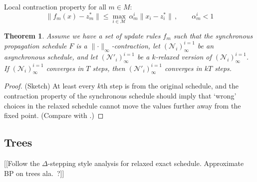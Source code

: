 \documentclass[11pt,a4paper]{article}
\newtheorem{theorem}{Theorem}
\theoremstyle{remark}
\newcommand{\M}{\mathcal{M}}
\newcommand{\N}{\mathcal{N}}
\newcommand{\norm}[1]{\lVert #1 \rVert}
\begin{document}
Local contraction property for all $m \in M$:
\[ \norm{f_m(x) - z_m^* } \le \max_{i \in \M} \, \alpha^i_m \norm{ x_i - z_i^* }\,,\qquad \alpha^i_m < 1  \]

\begin{theorem}
Assume we have a set of update rules $f_m$ such that the synchronous propagation schedule $F$ is a $\norm{\cdot}_\infty$-contraction, let $(\N_i)^{i = 1}_\infty$ be an asynchronous schedule, and let $(\N'_i)^{i = 1}_\infty$ be a $k$-relaxed version of $(\N_i)^{i = 1}_\infty$. If $(\N_i)^{i = 1}_\infty$ converges in $T$ steps, then $(\N'_i)^{i = 1}_\infty$ converges in $kT$ steps.
\end{theorem}

\begin{proof}
(Sketch) At least every $k$th step is from the original schedule, and the contraction property of the synchronous schedule should imply that `wrong' choices in the relaxed schedule cannot move the values further away from the fixed point. (Compare with \cite{elidan2006residual}.)
\end{proof}

\subsection{Trees}

[[Follow the $\Delta$-stepping style analysis for relaxed exact schedule. Approximate BP on trees ala.~\cite{pmlr-v5-gonzalez09a}?]]

\renewcommand{\doi}[1]{\href{http://dx.doi.org/#1}{\footnotesize\sf doi:\Doi{#1}}}



\end{document}

